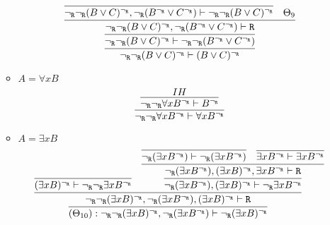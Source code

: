 \begin{enumerate}[(i)]
\begin{itemize}
            $$
                \infer{
                    \neg_\R\neg_\R(B \vee C)^{\neg_\R} \vdash (B \vee C)^{\neg_\R}
                }{
                    \infer{
                        \neg_\R\neg_\R(B \vee C)^{\neg_\R} \vdash \neg_\R\neg_\R(B^{\neg_\R} \vee C^{\neg_\R})
                    }{
                        \infer{
                            \neg_\R\neg_\R(B \vee C)^{\neg_\R}, \neg_\R(B^{\neg_\R} \vee C^{\neg_\R}) \vdash \R
                        }{
                            \infer{
                                \neg_\R\neg_\R(B \vee C)^{\neg_\R}, \neg_\R(B^{\neg_\R} \vee C^{\neg_\R}) \vdash \neg_\R\neg_\R(B \vee C)^{\neg_\R}
                            }{
                            }&
                            \Theta_9
                        }
                    }
                }
            $$
        \item $A=\forall x B$
            $$
                \infer{
                    \neg_\R\neg_\R \forall x B^{\neg_\R} \vdash \forall x B^{\neg_\R}
                }{
                    \infer{
                       \neg_\R\neg_\R \forall x B^{\neg_\R} \vdash B^{\neg_\R}
                    }{
                        IH
                    }
                }
            $$
        \item $A=\exists x B$
            $$\infer{
                            (\Theta_{10}) : \neg_\R\neg_\R(\exists x B)^{\neg_\R}, \neg_\R(\exists x B^{\neg_\R}) \vdash \neg_\R(\exists x B)^{\neg_\R}
                        }{
                            \infer{
                                \neg_\R\neg_\R(\exists x B)^{\neg_\R}, \neg_\R(\exists x B^{\neg_\R}), (\exists x B)^{\neg_\R} \vdash \R
                            }{
                                \infer{
                                    (\exists x B)^{\neg_\R} \vdash \neg_\R\neg_\R\exists x B^{\neg_\R}
                                }{
                                }&
                                \infer{
                                    \neg_\R(\exists x B^{\neg_\R}), (\exists x B)^{\neg_\R} \vdash \neg_\R\exists x B^{\neg_\R}
                                }{
                                    \infer{
                                        \neg_\R(\exists x B^{\neg_\R}), (\exists x B)^{\neg_\R}, \exists x B^{\neg_\R} \vdash \R
                                    }{
                                        \infer{
                                            \neg_\R(\exists x B^{\neg_\R}) \vdash \neg_\R(\exists x B^{\neg_\R})
                                        }{
                                        }&
                                        \infer{
                                            \exists x B^{\neg_\R} \vdash \exists x B^{\neg_\R}
                                        }{
                                        }
                                    }
                                }
                            }
                        }
            $$
        

\end{itemize}
\end{enumerate}
